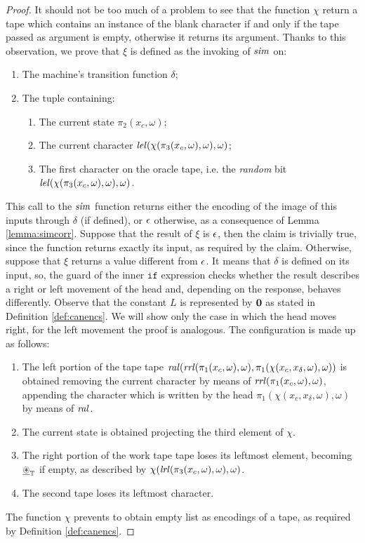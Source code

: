\applycorr*
\begin{proof}
  It should not be too much of a problem to see
  that the function $\chi$ return a tape which contains an instance of the
  blank character if and only if the tape passed as argument is empty,
  otherwise it returns its argument.
  Thanks to this observation, we prove that $\xi$ is defined as the
  invoking of $\mathit{sim}$ on:
  \begin{enumerate}
    \item The machine's transition function $\delta$;
    \item The tuple containing:
    \begin{enumerate}
      \item The current state $\pi_2(x_c, \omega)$;
      \item The current character $\mathit{lel}(\chi(\pi_3(x_c, \omega), \omega), \omega)$;
      \item The first character on the oracle tape, i.e.
      the \emph{random} bit $\mathit{lel}(\chi(\pi_3(x_c, \omega), \omega), \omega)$.
    \end{enumerate}
  \end{enumerate}
  This call to the $\mathit{sim}$ function returns either the encoding of the image of this inputs through $\delta$ (if defined), or $\epsilon$ otherwise, as a consequence of Lemma
  \ref{lemma:simcorr}.
  Suppose that the result of $\xi$ is $\epsilon$, then the claim is
  trivially true, since the function returns exactly its input, as required by the claim.
  Otherwise, suppose that $\xi$ returns a value different from $\epsilon$.
  It means that $\delta$ is defined on its input, so, the guard of the inner
  $\mathtt{if}$ expression checks whether the result describes a right or
  left movement of the head and, depending on the response, behaves
  differently. Observe that the constant $L$ is represented by $\mathbf{0}$
  as stated in Definition \ref{def:canencs}.
   We will show only the case in which the head moves right, for the left
   movement the proof is analogous. The configuration is made up as follows:
   \begin{enumerate}
     \item The left portion of the tape tape $\mathit{ral}(\mathit{rrl}(\pi_1(x_c,\omega),\omega),
    \pi_1(\chi(x_c, x_\delta, \omega),\omega))$
     is obtained removing the current character by means of
     $\mathit{rrl}(\pi_1(x_c,\omega),\omega)$, appending
     the character which is written by the head
     $\pi_1(\chi(x_c, x_\delta, \omega),\omega)$ by means of $\mathit{ral}$.
     \item The current state is obtained projecting
     the third element of $\chi$.
     \item The right portion of the work tape tape loses its leftmost element, becoming
     ${\underline {\circledast}}_{\mathbb{T}}$ if empty, as described by
     $\chi(\mathit{lrl}(\pi_3(x_c,\omega),\omega), \omega)$.
     \item The second tape loses its leftmost character.
   \end{enumerate}
   The function $\chi$ prevents to obtain empty list as encodings of a tape,
   as required by Definition \ref{def:canencs}.
  \end{proof}

